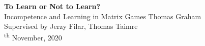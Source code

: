 
\begin{titlingpage}
    \vspace*{0.1\textheight}
    \begin{center}
        {
            \Huge\sffamily\bfseries\color{color1}
            To Learn or Not to Learn?
        }\\[\baselineskip]
        {
            \large\sffamily
            Incompetence and Learning in Matrix Games
        }
        \vfill
        {
            \small
            \sffamily
            Thomas Graham
        }\\[0.5\baselineskip]
        {
            \small
            \sffamily
            Supervised by Jerzy Filar, Thomas Taimre
        }\\[0.5\baselineskip]
        {
            \small
            \textsuperscript{th} November, 2020
        }
    \end{center}
    \vspace*{0.2\textheight}
\end{titlingpage}